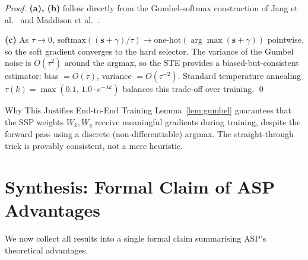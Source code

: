 \documentclass[11pt,a4paper]{article}
\begin{document}
\begin{proof}
\textbf{(a), (b)} follow directly from the Gumbel-softmax construction of
Jang et al.~\cite{jang2017} and Maddison et al.~\cite{maddison2017}.

\textbf{(c)} As $\tau \to 0$, $\mathrm{softmax}((\mathbf{s}+\gamma)/\tau) \to
\mathrm{one\text{-}hot}(\arg\max(\mathbf{s}+\gamma))$ pointwise, so the soft gradient
converges to the hard selector.  The variance of the Gumbel noise is $O(\tau^2)$
around the argmax, so the STE provides a biased-but-consistent estimator: bias
$= O(\tau)$, variance $= O(\tau^{-2})$.  Standard temperature annealing
$\tau(k) = \max(0.1,\, 1.0 \cdot e^{-\lambda k})$ balances this trade-off over
training.  \qed
\end{proof}

\begin{insightbox}{Why This Justifies End-to-End Training}
Lemma~\ref{lem:gumbel} guarantees that the SSP weights $W_k, W_q$ receive
meaningful gradients during training, despite the forward pass using a discrete
(non-differentiable) argmax.  The straight-through trick is provably consistent,
not a mere heuristic.
\end{insightbox}

\section{Synthesis: Formal Claim of ASP Advantages}

We now collect all results into a single formal claim summarising ASP's
theoretical advantages.
\end{document}
